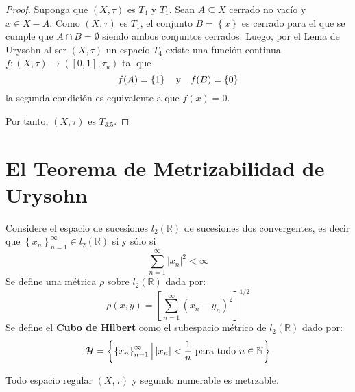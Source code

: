 \documentclass[12pt]{report}
\theoremstyle{largebreak}
\newcommand\abs[1]{\ensuremath{\left|#1\right|}}
\newcommand\cf[3]{\ensuremath{#1:#2\rightarrow#3}}
\begin{document}
    \begin{proof}
        Suponga que $(X,\tau)$ es $T_4$ y $T_1$. Sean $A\subseteq X$ cerrado no vacío y $x\in X-A$. Como $(X,\tau)$ es $T_1$, el conjunto $B=\left\{x \right\}$ es cerrado para el que se cumple que $A\cap B=\emptyset$ siendo ambos conjuntos cerrados. Luego, por el Lema de Urysohn al ser $(X,\tau)$ un espacio $T_4$ existe una función continua $\cf{f}{(X,\tau)}{([0,1],\tau_u)}$ tal que
        \begin{equation*}
            f(A)=\left\{1 \right\}\quad\textup{y}\quad f(B)=\left\{0 \right\}
        \end{equation*}
        la segunda condición es equivalente a que $f(x)=0$.

        Por tanto, $(X,\tau)$ es $T_{3.5}$.
    \end{proof}


    \section{El Teorema de Metrizabilidad de Urysohn}

    \begin{mydef}
        Considere el espacio de sucesiones $l_2(\mathbb{R})$ de sucesiones dos convergentes, es decir que $\left\{x_n \right\}_{ n=1}^\infty\in l_2(\mathbb{R})$ si y sólo si
        \begin{equation*}
            \sum_{ n=1}^\infty\abs{x_n}^2<\infty
        \end{equation*}
        Se define una métrica $\rho$ sobre $l_2(\mathbb{R})$ dada por:
        \begin{equation*}
            \rho(x,y)=\left[\sum_{ n=1}^\infty(x_n-y_n)^2\right]^{1/2}
        \end{equation*}
        Se define el \textbf{Cubo de Hilbert} como el subespacio métrico de $l_2(\mathbb{R})$ dado por:
        \begin{equation*}
            \mathcal{H}=\left\{\left\{x_n \right\}_{ n=1}^\infty\Big|\abs{x_n}<\frac{1}{n}\textup{ para todo }n\in\mathbb{N} \right\}
        \end{equation*}
    \end{mydef}

    \begin{theor}
        Todo espacio regular $(X,\tau)$ y segundo numerable es metrzable.
    \end{theor}
\end{document}
